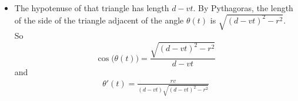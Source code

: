 \begin{eg}
\begin{itemize}
\item The hypotenuse of that triangle has length $d-vt$. By Pythagoras, the
length of the side of the triangle adjacent of the angle $\theta(t)$ is
$\sqrt{(d-vt)^2-r^2}$. So
\begin{equation*}
\cos\big(\theta(t)\big)=\frac{\sqrt{(d-vt)^2-r^2}}{d-vt}
\end{equation*}
and
\begin{align*}
\theta'(t)=\frac{rv}{(d-vt)\sqrt{(d-vt)^2-r^2}}
\end{align*}
%
\end{itemize}
\end{eg}

